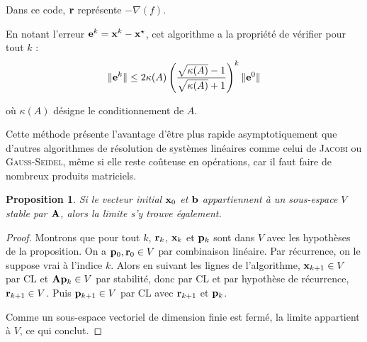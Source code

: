 \documentclass[svgnames,dvipsnames,a4paper,10pt,french]{report}
\newtheorem{proposition}[theorem]{Proposition}
\begin{document}
Dans ce code, $\mathbf{r}$ représente $- \nabla (f)$.

En notant l'erreur $\mathbf{e}^k = \mathbf{x}^k-\mathbf{x}^\star$, cet algorithme a la propriété de vérifier pour tout $k$ \cite{poliak_introduction_1987}:
\begin{equation}
\label{convergence_grad_conj}
    \|\mathbf{e}^k \| \le 2 \kappa (A) \left( \frac{\sqrt{\kappa (A)} - 1}{\sqrt{\kappa (A)} + 1} \right)^k \| \mathbf{e}^0\|
\end{equation}

où $\kappa (A)$ désigne le conditionnement de $A$.

Cette méthode présente l'avantage d'être plus rapide asymptotiquement que d'autres algorithmes de résolution de systèmes linéaires comme celui de \textsc{Jacobi} ou \textsc{Gauss-Seidel}, même si elle reste coûteuse en opérations, car il faut faire de nombreux produits matriciels.



\begin{proposition}
Si le vecteur initial $\mathbf{x}_0$ et $\mathbf{b}$ appartiennent à un sous-espace $V$ stable par $\mathbf{A}$, alors la limite s'y trouve également. 
\end{proposition}

\begin{proof}
Montrons que pour tout $k$, $\mathbf{r}_k$, $\mathbf{x}_k$ et $\mathbf{p}_k$ sont dans $V$ avec les hypothèses de la proposition.
On a $\mathbf{p}_0, \mathbf{r}_0 \in V$ par combinaison linéaire. Par récurrence, on le suppose vrai à l'indice $k$. Alors en suivant les lignes de l'algorithme, $\mathbf{x}_{k+1} \in V$ par CL et $\mathbf{A}\mathbf{p}_k \in V$ par stabilité, donc par CL et par hypothèse de récurrence, $\mathbf{r}_{k+1}\in V$. Puis $\mathbf{p}_{k+1} \in V$ par CL avec $\mathbf{r}_{k+1}$ et $\mathbf{p}_k$.

Comme un sous-espace vectoriel de dimension finie est fermé, la limite appartient à $V$, ce qui conclut.
\end{proof}
\end{document}
